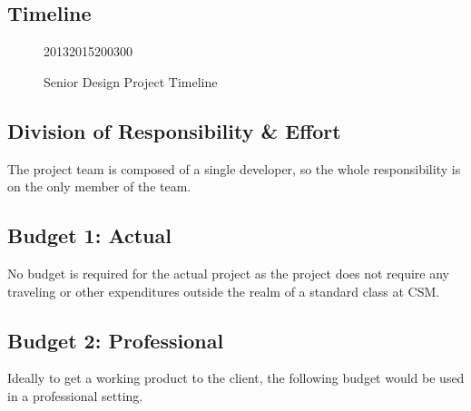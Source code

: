 \documentclass[11pt]{article}
\begin{document}
\subsection{Timeline}

\begin{figure}[H]

\begin{timeline}{2013}{2015}{200}{300}
  
  
\end{timeline}
\caption{Senior Design Project Timeline}
\end{figure}

\subsection{Division of Responsibility \& Effort}

The project team is composed of a single developer, so the whole responsibility is on the only member of the team. 

\subsection{Budget 1: Actual}

No budget is required for the actual project as the project does not require any traveling or other expenditures outside the realm of a standard class at CSM.

\subsection{Budget 2: Professional}

Ideally to get a working product to the client, the following budget would be used in a professional setting. 
\end{document}
